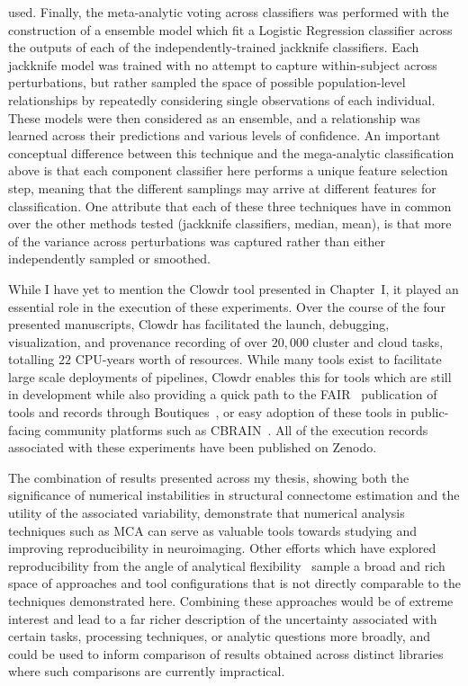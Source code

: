 used. Finally, the meta-analytic voting across classifiers was performed with the construction of a ensemble model
which fit a Logistic Regression classifier across the outputs of each of the independently-trained jackknife
classifiers. Each jackknife model was trained with no attempt to capture within-subject across perturbations, but
rather sampled the space of possible population-level relationships by repeatedly considering single observations
of each individual. These models were then considered as an ensemble, and a relationship was learned across their
predictions and various levels of confidence. An important conceptual difference between this technique and the
mega-analytic classification above is that each component classifier here performs a unique feature selection step,
meaning that the different samplings may arrive at different features for classification. One attribute that each of
these three techniques have in common over the other methods tested (jackknife classifiers, median, mean), is that
more of the variance across perturbations was captured rather than either independently sampled or smoothed.

While I have yet to mention the Clowdr tool presented in Chapter~I, it played an essential role in the execution of
these experiments. Over the course of the four presented manuscripts, Clowdr has facilitated the launch, debugging,
visualization, and provenance recording of over $20,000$ cluster and cloud tasks, totalling $22$ CPU-years worth of
resources. While many tools exist to facilitate large scale deployments of pipelines, Clowdr enables this for tools
which are still in development while also providing a quick path to the FAIR~\cite{wilkinson2016fair} publication of
tools and records through Boutiques~\cite{Glatard2018-tu}, or easy adoption of these tools in public-facing
community platforms such as CBRAIN~\cite{sherif2014cbrain}. All of the execution records associated with these
experiments have been published on Zenodo.

The combination of results presented across my thesis, showing both the significance of numerical instabilities in
structural connectome estimation and the utility of the associated variability, demonstrate that numerical analysis
techniques such as MCA can serve as valuable tools towards studying and improving reproducibility in neuroimaging.
Other efforts which have explored reproducibility from the angle of analytical
flexibility~\cite{botvinik2020variability,schilling2020tractography} sample a broad and rich space of approaches and
tool configurations that is not directly comparable to the techniques demonstrated here. Combining these approaches
would be of extreme interest and lead to a far richer description of the uncertainty associated with certain tasks,
processing techniques, or analytic questions more broadly, and could be used to inform comparison of results
obtained across distinct libraries where such comparisons are currently impractical.


